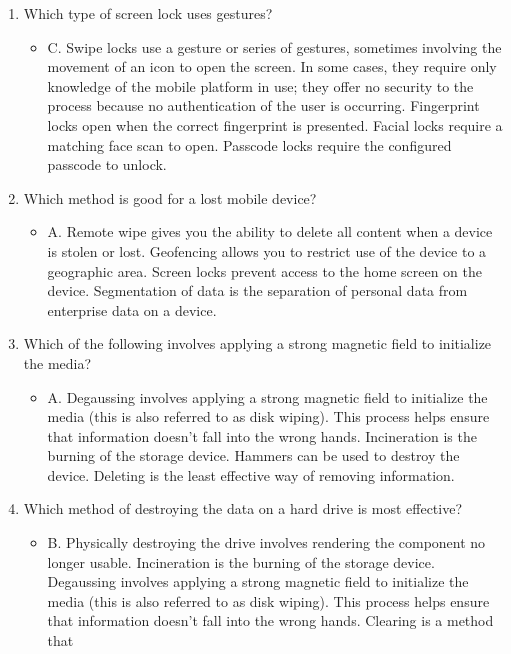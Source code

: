 \documentclass{article}
\begin{document}
\begin{enumerate}
\begin{itemize}
    \end{itemize}
    \item Which type of screen lock uses gestures?
    \begin{itemize}
        \item C. Swipe locks use a gesture or series of gestures, sometimes involving the movement
of an icon to open the screen. In some cases, they require only knowledge of the mobile
platform in use; they offer no security to the process because no authentication of the user
is occurring. Fingerprint locks open when the correct fingerprint is presented. Facial locks
require a matching face scan to open. Passcode locks require the configured passcode to
unlock.
    \end{itemize}
    \item Which method is good for a lost mobile device?
    \begin{itemize}
        \item A. Remote wipe gives you the ability to delete all content when a device is stolen or lost.
Geofencing allows you to restrict use of the device to a geographic area. Screen locks
prevent access to the home screen on the device. Segmentation of data is the separation of
personal data from enterprise data on a device.
    \end{itemize}
    \item Which of the following involves applying a strong magnetic field to initialize the media?
    \begin{itemize}
        \item A. Degaussing involves applying a strong magnetic field to initialize the media (this is also
referred to as disk wiping). This process helps ensure that information doesn’t fall into the
wrong hands. Incineration is the burning of the storage device. Hammers can be used to
destroy the device. Deleting is the least effective way of removing information.
    \end{itemize}
    \item Which method of destroying the data on a hard drive is most effective?
    \begin{itemize}
        \item B. Physically destroying the drive involves rendering the component no longer usable.
Incineration is the burning of the storage device. Degaussing involves applying a strong
magnetic field to initialize the media (this is also referred to as disk wiping). This process
helps ensure that information doesn’t fall into the wrong hands. Clearing is a method that

\end{itemize}
\end{enumerate}
\end{document}
